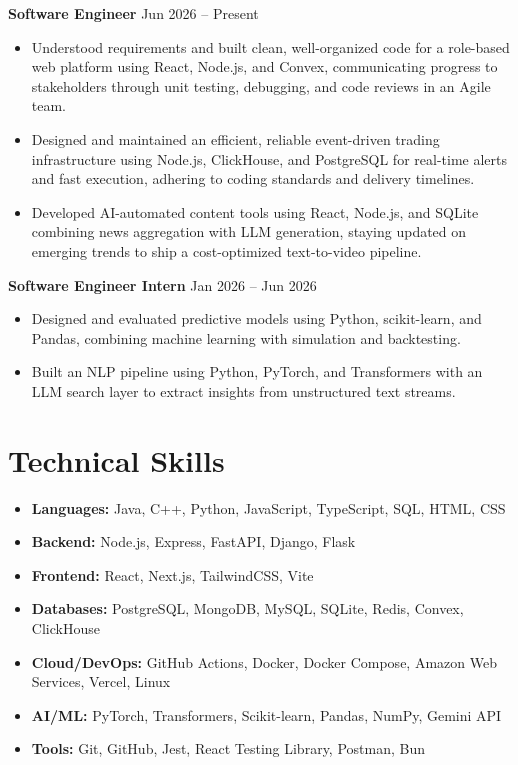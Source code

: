 \documentclass[a4paper,11pt]{article}
\newcommand{\resumeItem}[1]{\item \small{#1}}
\newcommand{\resumeSubHeadingListStart}{\begin{itemize}}
\newcommand{\resumeSubHeadingListEnd}{\end{itemize}}
\begin{document}
\textbf{Software Engineer} \hfill {Jun 2026 -- Present}
\resumeSubHeadingListStart
\resumeItem{Understood requirements and built clean, well-organized code for a role-based web platform using React, Node.js, and Convex, communicating progress to stakeholders through unit testing, debugging, and code reviews in an Agile team.}
\resumeItem{Designed and maintained an efficient, reliable event-driven trading infrastructure using Node.js, ClickHouse, and PostgreSQL for real-time alerts and fast execution, adhering to coding standards and delivery timelines.}
\resumeItem{Developed AI-automated content tools using React, Node.js, and SQLite combining news aggregation with LLM generation, staying updated on emerging trends to ship a cost-optimized text-to-video pipeline.}
\resumeSubHeadingListEnd

\textbf{Software Engineer Intern} \hfill {Jan 2026 -- Jun 2026}
\resumeSubHeadingListStart
\resumeItem{Designed and evaluated predictive models using Python, scikit-learn, and Pandas, combining machine learning with simulation and backtesting.}
\resumeItem{Built an NLP pipeline using Python, PyTorch, and Transformers with an LLM search layer to extract insights from unstructured text streams.}
\resumeSubHeadingListEnd


\section*{Technical Skills}
\begin{itemize}
\item \textbf{Languages:} Java, C++, Python, JavaScript, TypeScript, SQL, HTML, CSS
\item \textbf{Backend:} Node.js, Express, FastAPI, Django, Flask
\item \textbf{Frontend:} React, Next.js, TailwindCSS, Vite
\item \textbf{Databases:} PostgreSQL, MongoDB, MySQL, SQLite, Redis, Convex, ClickHouse
\item \textbf{Cloud/DevOps:} GitHub Actions, Docker, Docker Compose, Amazon Web Services, Vercel, Linux
\item \textbf{AI/ML:} PyTorch, Transformers, Scikit-learn, Pandas, NumPy, Gemini API
\item \textbf{Tools:} Git, GitHub, Jest, React Testing Library, Postman, Bun
\end{itemize}
\vspace{-0.2em}
\end{document}
